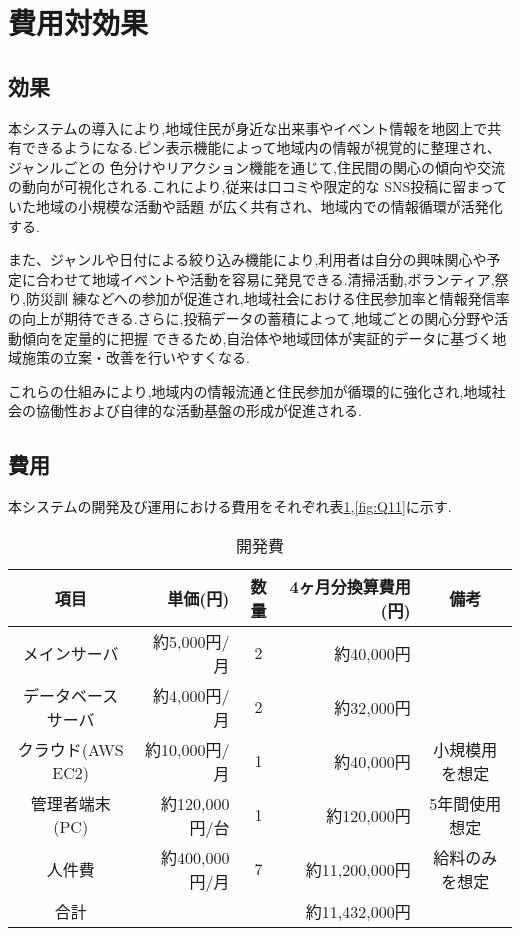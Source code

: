 \section{費用対効果}
\subsection{効果}
本システムの導入により,地域住民が身近な出来事やイベント情報を地図上で共有できるようになる.ピン表示機能によって地域内の情報が視覚的に整理され、ジャンルごとの
色分けやリアクション機能を通じて,住民間の関心の傾向や交流の動向が可視化される.これにより,従来は口コミや限定的な SNS投稿に留まっていた地域の小規模な活動や話題
が広く共有され、地域内での情報循環が活発化する.\par
また、ジャンルや日付による絞り込み機能により,利用者は自分の興味関心や予定に合わせて地域イベントや活動を容易に発見できる.清掃活動,ボランティア,祭り,防災訓
練などへの参加が促進され,地域社会における住民参加率と情報発信率の向上が期待できる.さらに,投稿データの蓄積によって,地域ごとの関心分野や活動傾向を定量的に把握
できるため,自治体や地域団体が実証的データに基づく地域施策の立案・改善を行いやすくなる. \par
これらの仕組みにより,地域内の情報流通と住民参加が循環的に強化され,地域社会の協働性および自律的な活動基盤の形成が促進される.

\subsection{費用}
本システムの開発及び運用における費用をそれぞれ表\ref{fig:Q10},\ref{fig:Q11}に示す.
\clearpage

\begin{table}[h]
  \centering
  \caption{開発費}
  \label{fig:Q10}
  \begin{tabular}{crcrc}
  \hline
  項目  & 単価(円) & 数量   & 4ヶ月分換算費用(円) & 備考\\ \hline\hline
  
メインサーバ  & 約5,000円/月 & 2  & 約40,000円&  \\ \hline

データベースサーバ & 約4,000円/月 & 2  & 約32,000円& \\\hline

クラウド(AWS EC2) &約10,000円/月 &1 & 約40,000円& 小規模用を想定\\ \hline

管理者端末(PC) & 約120,000円/台& 1& 約120,000円& 5年間使用想定 \\ \hline

人件費　 & 約400,000円/月 & 7& 約11,200,000円& 給料のみを想定\\ \hline\hline

合計　& & & 約11,432,000円\\ \hline
\end{tabular}
\end{table}



